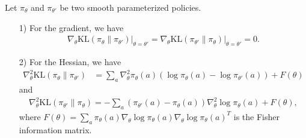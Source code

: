 \begin{lemma}
    Let $\pi_\theta$ and $\pi_{\theta'}$ be two smooth parameterized policies.
    \begin{enumerate}
        \item[\textup{1)}] For the gradient, we have
        \begin{align*}
            \left.\nabla_\theta\mathrm{KL}(\pi_\theta\|\pi_{\theta'})\right|_{\theta=\theta'}=\left.\nabla_\theta\mathrm{KL}(\pi_{\theta'}\|\pi_{\theta})\right|_{\theta=\theta'}=0.
        \end{align*}
        \item[\textup{2)}] For the Hessian, we have
        \begin{align*}
            \nabla_\theta^2\mathrm{KL}(\pi_\theta\|\pi_{\theta'})&=\sum_a\nabla_\theta^2\pi_\theta(a)(\log\pi_\theta(a)-\log\pi_{{\theta'}}(a))+F(\theta)
        \end{align*}
        and
        \begin{align*}
            \nabla_\theta^2\mathrm{KL}(\pi_{{\theta'}}\|\pi_{{\theta}})=-\sum_a\left(\pi_{{\theta'}}(a)-\pi_\theta(a)\right)\nabla_\theta^2\log\pi_\theta(a)+F(\theta),
        \end{align*}
        where $F(\theta)=\sum_a\pi_\theta(a)\nabla_\theta\log\pi_\theta(a)\nabla_\theta\log\pi_\theta(a)^T$ is the Fisher information matrix.
    \end{enumerate}
    \label{lem:KL-grad/Hessian}
\end{lemma}



